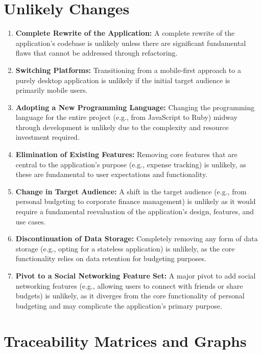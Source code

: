 \documentclass[12pt]{article}
\begin{document}
\newpage

\section{Unlikely Changes}    

\begin{enumerate}[label=ULC\arabic*]
	\item \textbf{Complete Rewrite of the Application:} A complete rewrite of the
	application's codebase is unlikely unless there are significant fundamental
	flaws that cannot be addressed through refactoring.
	\item \textbf{Switching Platforms:} Transitioning from a mobile-first approach
	to a purely desktop application is unlikely if the initial target audience is
	primarily mobile users.
	\item \textbf{Adopting a New Programming Language:} Changing the programming
	language for the entire project (e.g., from JavaScript to Ruby) midway through
	development is unlikely due to the complexity and resource investment
	required.
	\item \textbf{Elimination of Existing Features:} Removing core features that
	are central to the application's purpose (e.g., expense tracking) is unlikely,
	as these are fundamental to user expectations and functionality.
	\item \textbf{Change in Target Audience:} A shift in the target audience
	(e.g., from personal budgeting to corporate finance management) is unlikely as
	it would require a fundamental reevaluation of the application's design,
	features, and use cases.
	\item \textbf{Discontinuation of Data Storage:} Completely removing any form
	of data storage (e.g., opting for a stateless application) is unlikely, as the
	core functionality relies on data retention for budgeting purposes.
	\item \textbf{Pivot to a Social Networking Feature Set:} A major pivot to add
	social networking features (e.g., allowing users to connect with friends or
	share budgets) is unlikely, as it diverges from the core functionality of
	personal budgeting and may complicate the application's primary purpose.
\end{enumerate}

\newpage

\section{Traceability Matrices and Graphs}
\end{document}
